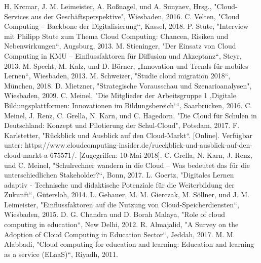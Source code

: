 \documentclass[conference]{IEEEtran}
\begin{document}
\begin{thebibliography}{00}
 H. Krcmar, J. M. Leimeister, A. Roßnagel, und A. Sunyaev, Hrsg., "Cloud-Services aus der Geschäftsperspektive", Wiesbaden, 2016.
 C. Velten, "Cloud Computing – Backbone der Digitalisierung“, Kassel, 2018.
 P. Stute, "Interview mit Philipp Stute zum Thema Cloud Computing: Chancen, Risiken und Nebenwirkungen“, Augsburg, 2013.
 M. Stieninger, "Der Einsatz von Cloud Computing in KMU – Einflussfaktoren für Diffusion und Akzeptanz“, Steyr, 2013.
 M. Specht, M. Kalz, und D. Börner, „Innovation und Trends für mobiles Lernen“, Wiesbaden, 2013.
 M. Schweizer, "Studie cloud migration 2018“, München, 2018.
 D. Mietzner, "Strategische Vorausschau und Szenarioanalysen", Wiesbaden, 2009.
 C. Meinel, "Die Mitglieder der Arbeitsgruppe 1 ‚Digitale Bildungsplattformen: Innovationen im Bildungsbereich‘“, Saarbrücken, 2016.
 C. Meinel, J. Renz, C. Grella, N. Karn, und C. Hagedorn, "Die Cloud für Schulen in Deutschland: Konzept und Pilotierung der Schul-Cloud", Potsdam, 2017.
 F. Karlstetter, "Rückblick und Ausblick auf den Cloud-Markt“. [Online]. Verfügbar unter: https://www.cloudcomputing-insider.de/rueckblick-und-ausblick-auf-den-cloud-markt-a-675571/. [Zugegriffen: 10-Mai-2018].
 C. Grella, N. Karn, J. Renz, und C. Meinel, "Schulrechner wandern in die Cloud – Was bedeutet das für die unterschiedlichen Stakeholder?“, Bonn, 2017.
 L. Goertz, "Digitales Lernen adaptiv - Technische und didaktische Potenziale für die Weiterbildung der Zukunft“, Gütersloh, 2014.
 L. Gebauer, M. M. Gierczak, M. Söllner, und J. M. Leimeister, "Einflussfaktoren auf die Nutzung von Cloud-Speicherdiensten“, Wiesbaden, 2015.
 D. G. Chandra und D. Borah Malaya, "Role of cloud computing in education“, New Delhi, 2012.
 R. Almajalid, "A Survey on the Adoption of Cloud Computing in Education Sector“, Jeddah, 2017.
 M. M. Alabbadi, "Cloud computing for education and learning: Education and learning as a service (ELaaS)“, Riyadh, 2011.

\end{thebibliography}
\end{document}
